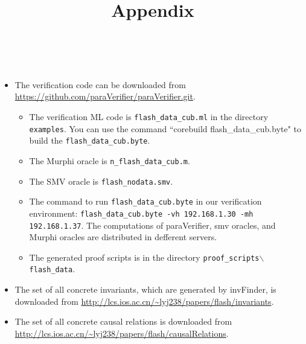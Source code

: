 \documentclass{llncs}
\begin{document}
\title{ Appendix }
\author{~}
\authorrunning{~}
\institute{~}

\maketitle
\begin{itemize}
 \item The verification code can be downloaded from \url{https://github.com/paraVerifier/paraVerifier.git}.
   \begin{itemize}
    \item The verification ML code is {\tt flash\_data\_cub.ml} in the directory {\tt examples}. You can use the command ``corebuild flash\_data\_cub.byte" to build the {\tt flash\_data\_cub.byte}.

     \item The Murphi oracle is {\tt n\_flash\_data\_cub.m}.  
     \item The SMV oracle is {\tt flash\_nodata.smv}.
     \item The command to run {\tt flash\_data\_cub.byte} in our verification environment: {\tt flash\_data\_cub.byte -vh 192.168.1.30 -mh 192.168.1.37}. The computations of {\sf paraVerifier}, smv oracles, and Murphi oracles are distributed in defferent servers.
     \item The generated proof scripts is  in the directory {\tt proof\_scripts$\backslash$flash\_data}.

  \end{itemize}

  \item   The set of all  concrete invariants, which are generated by {\sf invFinder}, is downloaded from \url{http://lcs.ios.ac.cn/~lyj238/papers/flash/invariants}.

   \item   The set of all  concrete causal relations is downloaded from \url{http://lcs.ios.ac.cn/~lyj238/papers/flash/causalRelations}.
\end{itemize}





\end{document}
